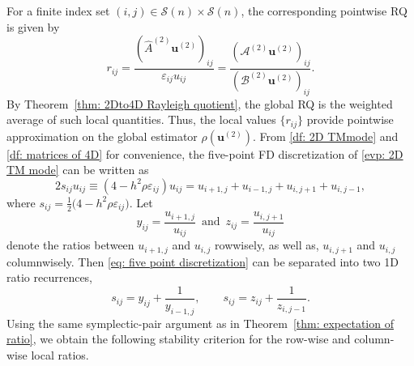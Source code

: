 \documentclass[11pt]{article}
\newcommand{\alter}{\textcolor{blue}}
\def\u{\mathbf{u}}
\numberwithin{equation}{section}
\begin{document}
For a finite index set  $(i,j) \in \mathcal{S}(n) \times \mathcal{S}(n)$, the corresponding pointwise RQ is given by
\begin{equation} \label{eq: approximate of rho}
r_{ij}
=
\frac{(\widehat{A}^{(2)}\u^{(2)})_{ij}}{\varepsilon_{ij} u_{ij}}
=
\frac{(\mathcal{A}^{(2)} \boldsymbol{u}^{(2)})_{ij}}{(\mathcal{B}^{(2)} \boldsymbol{u}^{(2)})_{ij}}.
\end{equation}
By Theorem~\ref{thm: 2Dto4D Rayleigh quotient}, the global RQ is the weighted average of such local quantities. Thus, the local values $\{r_{ij}\}$ provide pointwise approximation on the global estimator $\rho(\boldsymbol{u}^{(2)})$.
From \eqref{df: 2D TMmode} and \eqref{df: matrices of 4D} for convenience, the five-point FD discretization of \eqref{evp: 2D TM mode} can be written as
\begin{equation} \label{eq: five point discretization}
2s_{ij} u_{ij}
\equiv
(4 - h^2\rho \varepsilon_{ij}) u_{ij}
=
u_{i+1,j} + u_{i-1,j} + u_{i,j+1} + u_{i,j-1},
\end{equation}
where $ s_{ij} = \frac{1}{2}\big(4 - h^2\rho \varepsilon_{ij}\big).$
Let
\begin{equation} \label{def: y_ij and z_ij}
y_{ij} = \frac{u_{i+1,j}}{u_{ij}} \,\,\,
\text{and} \,\,\,
z_{ij} = \frac{u_{i,j+1}}{u_{ij}}
\end{equation}
denote the ratios between $u_{i+1,j}$ and $u_{i,j}$ rowwisely, as well as, $u_{i,j+1}$ and $u_{i,j}$ columnwisely. Then \eqref{eq: five point discretization} can be separated into two 1D ratio recurrences,
\begin{equation} \label{def: p_ij with y and z}
s_{ij} = y_{ij} + \frac{1}{y_{i-1,j}},
\qquad
s_{ij} = z_{ij} + \frac{1}{z_{i,j-1}}.
\end{equation}
Using the same symplectic-pair argument as in Theorem~\ref{thm: expectation of ratio}, we obtain the following stability criterion for the row-wise and column-wise local ratios.
\end{document}
